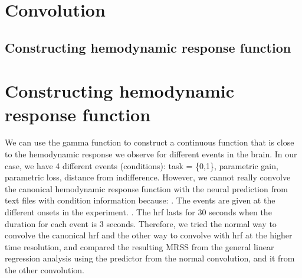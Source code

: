 \section {Convolution}

\subsection{Constructing hemodynamic response function}

\section{Constructing hemodynamic response function}
We can use the gamma function to construct a continuous function that is close to 
the hemodynamic response we observe for different events in the brain. In our case,
we have 4 different events (conditions): task = \{0,1\}, parametric gain, parametric loss, distance 
from indifference. However, we cannot really convolve the canonical hemodynamic response function with the neural prediction from text files with condition information because:\newline
\newline
{}. The events are given at the different onsets in the experiment.\newline
{}. The hrf lasts for 30 seconds when the duration for each event is 3 seconds.\newline
\newline
Therefore, we tried the normal way to convolve the canonical hrf and the other way to convolve with hrf at the higher time resolution, and compared the resulting MRSS from the general linear regression analysis using the predictor from the normal convolution, and it from the other convolution.\newline


